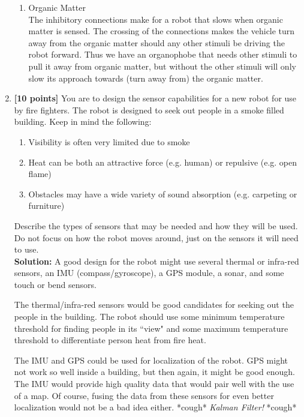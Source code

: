 \documentclass{article}
\begin{document}
\begin{enumerate}
\begin{enumerate}
    \item Organic Matter \\
    The inhibitory connections make for a robot that slows when organic matter is sensed. The crossing of the connections makes the vehicle turn away from the organic matter should any other stimuli be driving the robot forward. Thus we have an organophobe that needs other stimuli to pull it away from organic matter, but without the other stimuli will only slow its approach towards (turn away from) the organic matter. \newline \\
    \end{enumerate}


\item \textbf{[10 points]} You are to design the sensor capabilities for a new robot for use by fire fighters. The robot is designed to seek out people in a smoke filled building. Keep in mind the following:
    \begin{enumerate}
    \item Visibility is often very limited due to smoke

    \item Heat can be both an attractive force (e.g. human) or repulsive
          (e.g. open flame)

    \item Obstacles may have a wide variety of sound absorption (e.g.
          carpeting or furniture)
    \end{enumerate}

Describe the types of sensors that may be needed and how they will be used. Do not focus on how the robot moves around, just on the sensors it will need to use. \\

\textbf{Solution:} A good design for the robot might use several thermal or infra-red sensors, an IMU (compass/gyroscope), a GPS module, a sonar, and some touch or bend sensors.

The thermal/infra-red sensors would be good candidates for seeking out the people in the building. The robot should use some minimum temperature threshold for finding people in its ``view" and some maximum temperature threshold to differentiate person heat from fire heat.

The IMU and GPS could be used for localization of the robot. GPS might not work so well inside a building, but then again, it might be good enough. The IMU would provide high quality data that would pair well with the use of a map. Of course, fusing the data from these sensors for even better localization would not be a bad idea either. *cough* \emph{Kalman Filter!} *cough*


\end{enumerate}
\end{document}
